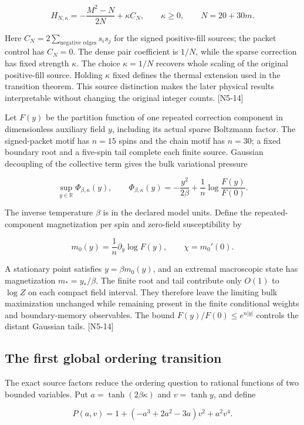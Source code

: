 \[H_{N,\kappa}=-\frac{M^2-N}{2N}+\kappa C_N,\qquad \kappa\ge0,\qquad N=20+30m.\]

Here \(C_N=2\sum_{\text{negative edges}}s_i s_j\) for the signed positive-fill sources; the packet control has \(C_N=0\). The dense pair coefficient is \(1/N\), while the sparse correction has fixed strength \(\kappa\). The choice \(\kappa=1/N\) recovers whole scaling of the original positive-fill source. Holding \(\kappa\) fixed defines the thermal extension used in the transition theorem. This source distinction makes the later physical results interpretable without changing the original integer counts. {[}N5-14{]}

Let \(F(y)\) be the partition function of one repeated correction component in dimensionless auxiliary field \(y\), including its actual sparse Boltzmann factor. The signed-packet motif has \(n=15\) spins and the chain motif has \(n=30\); a fixed boundary root and a five-spin tail complete each finite source. Gaussian decoupling of the collective term gives the bulk variational pressure

\[\sup_{y\in\mathbb R}\Phi_{\beta,\kappa}(y),\qquad
\Phi_{\beta,\kappa}(y)=-\frac{y^2}{2\beta}+\frac1n\log\frac{F(y)}{F(0)}.\]

The inverse temperature \(\beta\) is in the declared model units. Define the repeated-component magnetization per spin and zero-field susceptibility by

\[m_0(y)=\frac1n\partial_y\log F(y),\qquad \chi=m_0'(0).\]

A stationary point satisfies \(y=\beta m_0(y)\), and an extremal macroscopic state has magnetization \(m_*=y_*/\beta\). The finite root and tail contribute only \(O(1)\) to \(\log Z\) on each compact field interval. They therefore leave the limiting bulk maximization unchanged while remaining present in the finite conditional weights and boundary-memory observables. The bound \(F(y)/F(0)\le e^{n|y|}\) controls the distant Gaussian tails. {[}N5-14{]}

\subsection{The first global ordering transition}\label{the-first-global-ordering-transition}

The exact source factors reduce the ordering question to rational functions of two bounded variables. Put \(a=\tanh(2\beta\kappa)\) and \(v=\tanh y\), and define

\[P(a,v)=1+(-a^3+2a^2-3a)v^2+a^2v^4.\]

